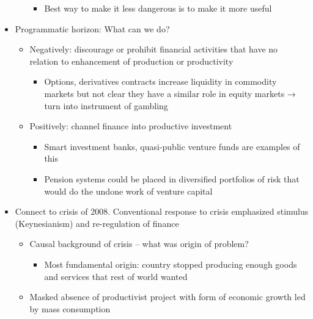 \begin{itemize}
\begin{itemize}
    \begin{itemize}
    \tightlist
    \item
      Best way to make it less dangerous is to make it more useful
    \end{itemize}
  \end{itemize}
\item
  Programmatic horizon: What can we do?

  \begin{itemize}
  \tightlist
  \item
    Negatively: discourage or prohibit financial activities that have no
    relation to enhancement of production or productivity

    \begin{itemize}
    \tightlist
    \item
      Options, derivatives contracts increase liquidity in commodity
      markets but not clear they have a similar role in equity markets →
      turn into instrument of gambling
    \end{itemize}
  \item
    Positively: channel finance into productive investment

    \begin{itemize}
    \tightlist
    \item
      Smart investment banks, quasi-public venture funds are examples of
      this
    \item
      Pension systems could be placed in diversified portfolios of risk
      that would do the undone work of venture capital
    \end{itemize}
  \end{itemize}
\item
  Connect to crisis of 2008. Conventional response to crisis emphasized
  stimulus (Keynesianism) and re-regulation of finance

  \begin{itemize}
  \tightlist
  \item
    Causal background of crisis -- what was origin of problem?

    \begin{itemize}
    \tightlist
    \item
      Most fundamental origin: country stopped producing enough goods
      and services that rest of world wanted
    \end{itemize}
  \item
    Masked absence of productivist project with form of economic growth
    led by mass consumption


\end{itemize}
\end{itemize}
